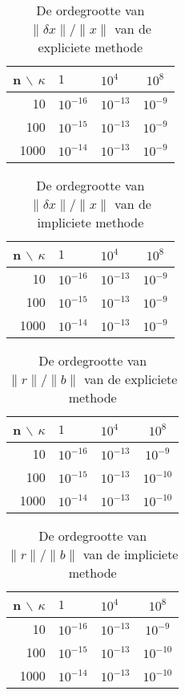 \begin{table}
\begin{center}
\begin{tabular}{r|llc}
n $\backslash$ $\kappa$ & $1$ & $10^4$ & $10^8$ \\\hline
10 & $10^{-16}$ & $10^{-13}$ & $10^{-9}$ \\
100 & $10^{-15}$ & $10^{-13}$ & $10^{-9}$ \\
1000 & $10^{-14}$ & $10^{-13}$ & $10^{-9}$
\end{tabular}
\end{center}
\caption{De ordegrootte van $\lVert \delta x \rVert/\lVert x \rVert$ van de expliciete methode}
\label{dx_exp}
\end{table}

\begin{table}
\begin{center}
\begin{tabular}{r|llc}
n $\backslash$ $\kappa$ & $1$ & $10^4$ & $10^8$ \\\hline
10 & $10^{-16}$ & $10^{-13}$ & $10^{-9}$ \\
100 & $10^{-15}$ & $10^{-13}$ & $10^{-9}$ \\
1000 & $10^{-14}$ & $10^{-13}$ & $10^{-9}$
\end{tabular}
\end{center}
\caption{De ordegrootte van $\lVert \delta x \rVert/\lVert x \rVert$ van de impliciete methode}
\label{dx_imp}
\end{table}

\begin{table}
\begin{center}
\begin{tabular}{r|llc}
n $\backslash$ $\kappa$ & $1$ & $10^4$ & $10^8$ \\\hline
10 & $10^{-16}$ & $10^{-13}$ & $10^{-9}$ \\
100 & $10^{-15}$ & $10^{-13}$ & $10^{-10}$ \\
1000 & $10^{-14}$ & $10^{-13}$ & $10^{-10}$
\end{tabular}
\end{center}
\caption{De ordegrootte van $\lVert r \rVert/\lVert b \rVert$ van de expliciete methode}
\label{rb_exp}
\end{table}

\begin{table}
\begin{center}
\begin{tabular}{r|llc}
n $\backslash$ $\kappa$ & $1$ & $10^4$ & $10^8$ \\\hline
10 & $10^{-16}$ & $10^{-13}$ & $10^{-9}$ \\
100 & $10^{-15}$ & $10^{-13}$ & $10^{-10}$ \\
1000 & $10^{-14}$ & $10^{-13}$ & $10^{-10}$
\end{tabular}
\end{center}
\caption{De ordegrootte van $\lVert r \rVert/\lVert b \rVert$ van de impliciete methode}
\label{rb_imp}
\end{table}